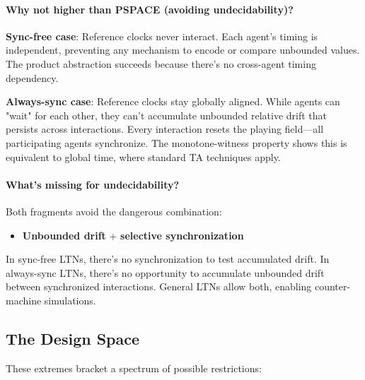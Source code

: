\paragraph{Why not higher than PSPACE (avoiding undecidability)?} 

\textbf{Sync-free case}: Reference clocks never interact. Each agent's timing is independent, preventing any mechanism to encode or compare unbounded values. The product abstraction succeeds because there's no cross-agent timing dependency.

\textbf{Always-sync case}: Reference clocks stay globally aligned. While agents can "wait" for each other, they can't accumulate unbounded relative drift that persists across interactions. Every interaction resets the playing field—all participating agents synchronize. The monotone-witness property shows this is equivalent to global time, where standard TA techniques apply.

\paragraph{What's missing for undecidability?} Both fragments avoid the dangerous combination:
\begin{itemize}
\item \textbf{Unbounded drift} + \textbf{selective synchronization}
\end{itemize}

In sync-free LTNs, there's no synchronization to test accumulated drift. In always-sync LTNs, there's no opportunity to accumulate unbounded drift between synchronized interactions. General LTNs allow both, enabling counter-machine simulations.

\subsection{The Design Space}

These extremes bracket a spectrum of possible restrictions:

\begin{center}
\end{center}

